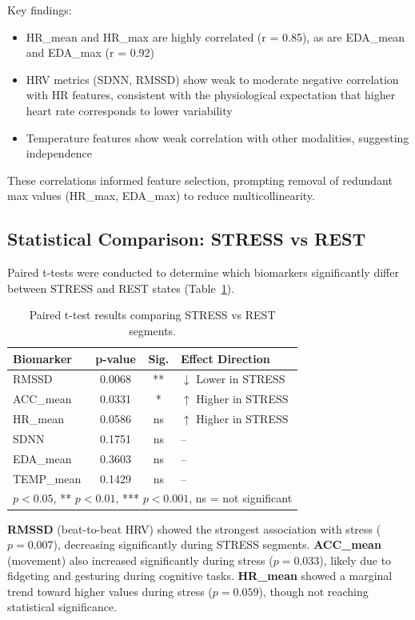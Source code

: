 \documentclass[12pt,letterpaper]{article}
\begin{document}
Key findings:
\begin{itemize}
    \item HR\_mean and HR\_max are highly correlated (r = 0.85), as are EDA\_mean and EDA\_max (r = 0.92)
    \item HRV metrics (SDNN, RMSSD) show weak to moderate negative correlation with HR features, consistent with the physiological expectation that higher heart rate corresponds to lower variability
    \item Temperature features show weak correlation with other modalities, suggesting independence
\end{itemize}

These correlations informed feature selection, prompting removal of redundant max values (HR\_max, EDA\_max) to reduce multicollinearity.

\subsection{Statistical Comparison: STRESS vs REST}

Paired t-tests were conducted to determine which biomarkers significantly differ between STRESS and REST states (Table~\ref{tab:ttests}).

\begin{table}[H]
\centering
\caption{Paired t-test results comparing STRESS vs REST segments.}
\label{tab:ttests}
\begin{tabular}{lccl}
\toprule
\textbf{Biomarker} & \textbf{p-value} & \textbf{Sig.} & \textbf{Effect Direction} \\
\midrule
RMSSD         & 0.0068 & **  & $\downarrow$ Lower in STRESS \\
ACC\_mean     & 0.0331 & *   & $\uparrow$ Higher in STRESS \\
HR\_mean      & 0.0586 & ns  & $\uparrow$ Higher in STRESS \\
SDNN          & 0.1751 & ns  & -- \\
EDA\_mean     & 0.3603 & ns  & -- \\
TEMP\_mean    & 0.1429 & ns  & -- \\
\bottomrule
\multicolumn{4}{l}{\small * $p < 0.05$, ** $p < 0.01$, *** $p < 0.001$, ns = not significant}
\end{tabular}
\end{table}

\textbf{RMSSD} (beat-to-beat HRV) showed the strongest association with stress ($p = 0.007$), decreasing significantly during STRESS segments. \textbf{ACC\_mean} (movement) also increased significantly during stress ($p = 0.033$), likely due to fidgeting and gesturing during cognitive tasks. \textbf{HR\_mean} showed a marginal trend toward higher values during stress ($p = 0.059$), though not reaching statistical significance.
\end{document}
